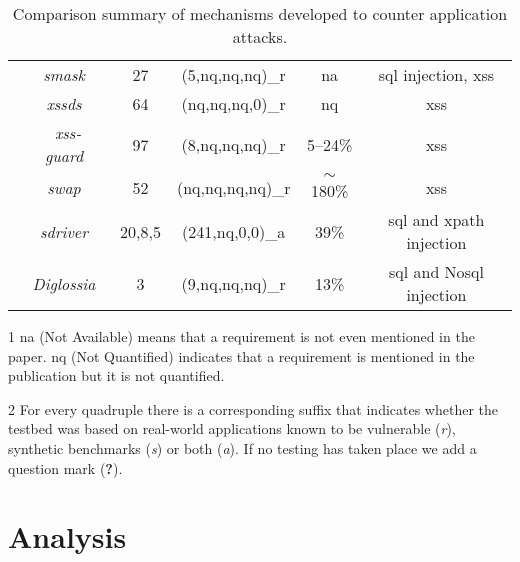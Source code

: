 \documentclass[conference]{IEEEtran}
\newcommand{\xmark}{\ding{56}}
\begin{document}
\begin{landscape}
\begin{table}
\begin{threeparttable}
\begin{small}
{\begin{tabular}{l|c|c|cc|c}
	& 	{\it {\sc sm}ask}~\cite{JB07} & 27 & (5,{\sc nq},{\sc nq},{\sc nq})\_r  & {\sc na} & {\sc sql} injection, {\sc xss} \\
	& 	{\it {\sc xssds}}~\cite{JEP08} & 64 & ({\sc nq},{\sc nq},{\sc nq},0)\_r & {\sc nq} &  {\sc xss} \\
    & 	{\it {\sc xss-guard}}~\cite{BV08} & 97 & (8,{\sc nq},{\sc nq},{\sc nq})\_r & 5--24\% & {\sc xss} \\
    & 	{\it {\sc swap}}~\cite{WPLKK09} & 52 & ({\sc nq},{\sc nq},{\sc nq},{\sc nq})\_r & $\sim$180\% & {\sc xss} \\ 
	& 	{\it {\sc sd}river}~\cite{MS09,MKS09,MKLS11} & 20,8,5 & (241,{\sc nq},0,0)\_a & 39\% & {\sc sql} and {\sc xp}ath injection \\
	& 	{\it Diglossia}~\cite{SMS13} & 3 & (9,{\sc nq},{\sc nq},{\sc nq})\_r & 13\% & {\sc sql} and No{\sc sql} injection \\
	\hline
    \end{tabular}}
    \begin{tablenotes}
	\begin{footnotesize}
       	\item[1] {\sc na} (Not Available) means that a requirement is not even mentioned in the paper.
	{\sc nq} (Not Quantified) indicates that a requirement is mentioned in the publication
	but it is not quantified.
		\item[2] For every quadruple there is a corresponding suffix that indicates whether the testbed was
	based on real-world applications known to be vulnerable ({\it r}), synthetic benchmarks ({\it s}) or both ({\it a}).
	If no testing has taken place we add a question mark ({\bf ?}).
	\end{footnotesize}
    \end{tablenotes}
    \caption{Comparison summary of mechanisms developed to counter application attacks.}
    \label{tab:comp2}
    \end{small}
    \end{threeparttable}
\end{table}
\end{landscape}

\section{Analysis}
\end{document}

